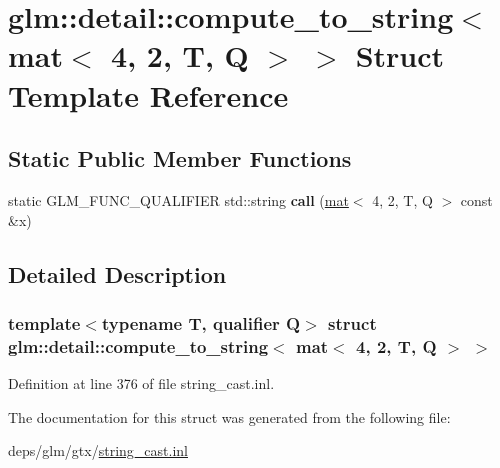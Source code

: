 \hypertarget{structglm_1_1detail_1_1compute__to__string_3_01mat_3_014_00_012_00_01T_00_01Q_01_4_01_4}{}\section{glm\+:\+:detail\+:\+:compute\+\_\+to\+\_\+string$<$ mat$<$ 4, 2, T, Q $>$ $>$ Struct Template Reference}
\label{structglm_1_1detail_1_1compute__to__string_3_01mat_3_014_00_012_00_01T_00_01Q_01_4_01_4}
\subsection*{Static Public Member Functions}
\begin{DoxyCompactItemize}
\item 
\mbox{\label{structglm_1_1detail_1_1compute__to__string_3_01mat_3_014_00_012_00_01T_00_01Q_01_4_01_4_af5b35e5a4cb38e51bcde9ae1eba1d126}} 
static G\+L\+M\+\_\+\+F\+U\+N\+C\+\_\+\+Q\+U\+A\+L\+I\+F\+I\+ER std\+::string {\bfseries call} (\hyperlink{structglm_1_1mat}{mat}$<$ 4, 2, T, Q $>$ const \&x)
\end{DoxyCompactItemize}


\subsection{Detailed Description}
\subsubsection*{template$<$typename T, qualifier Q$>$\newline
struct glm\+::detail\+::compute\+\_\+to\+\_\+string$<$ mat$<$ 4, 2, T, Q $>$ $>$}



Definition at line 376 of file string\+\_\+cast.\+inl.



The documentation for this struct was generated from the following file\+:\begin{DoxyCompactItemize}
\item 
deps/glm/gtx/\hyperlink{string__cast_8inl}{string\+\_\+cast.\+inl}\end{DoxyCompactItemize}
